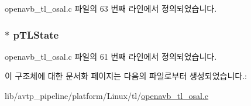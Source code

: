 openavb\+\_\+tl\+\_\+osal.\+c 파일의 63 번째 라인에서 정의되었습니다.

\subsubsection[{\texorpdfstring{p\+T\+L\+State}{pTLState}}]{$\ast$ p\+T\+L\+State}\hypertarget{structparse__ini__data__t_a442eb370b9ed2c74607fcaaecc9fef2a}{}\label{structparse__ini__data__t_a442eb370b9ed2c74607fcaaecc9fef2a}


openavb\+\_\+tl\+\_\+osal.\+c 파일의 61 번째 라인에서 정의되었습니다.



이 구조체에 대한 문서화 페이지는 다음의 파일로부터 생성되었습니다.\+:\begin{DoxyCompactItemize}
\item 
lib/avtp\+\_\+pipeline/platform/\+Linux/tl/\hyperlink{openavb__tl__osal_8c}{openavb\+\_\+tl\+\_\+osal.\+c}\end{DoxyCompactItemize}
